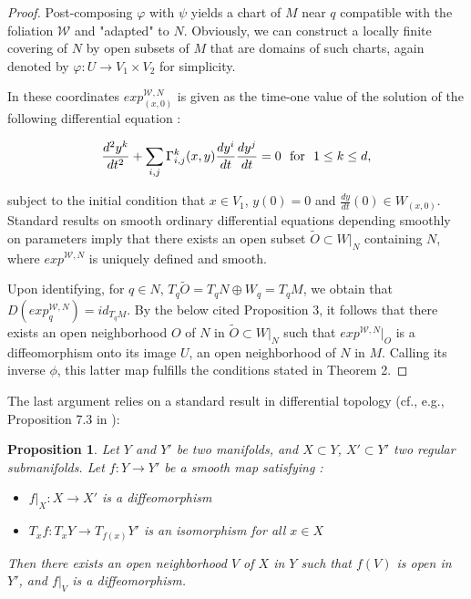 \documentclass[a4paper,12pt,leqno]{article}
\newtheorem{prop}{Proposition}
\begin{document}
\begin{proof}
Post-composing $\varphi$ with $\psi$ yields a chart of $M$ near $q$ compatible with the foliation $\mathcal{W}$ and "adapted" to $N$. 
Obviously, we can construct a locally finite covering of $N$ by open subsets of $M$ that are domains of such charts, again 
denoted by $\varphi:U\rightarrow V_1\times V_2$ for simplicity.

In these coordinates  $exp^{\mathcal{W},N}_{(x,0)}$ is given as the time-one value of the solution of the following differential equation : 



\begin{equation*}
\frac{d^2 y^k}{dt^2} + \sum_{i,j}\Gamma_{i,j}^k(x,y)\frac{d y^i}{dt} \frac{d y^j}{dt}=0   \,\,\,\,    \hbox{for}\, \,\, \,  1\leq k \leq d, 
\end{equation*}

\noindent subject to the initial condition that $x\in V_1$, $y(0)=0$ and $\frac{dy}{dt}(0)\in W_{(x,0)}$. Standard results on smooth ordinary 
differential equations depending smoothly on parameters imply that there exists an open subset $\widetilde{O}\subset W|_N$ 
containing $N$, where $exp^{\mathcal{W},N}$ is uniquely defined and smooth. 

Upon identifying, for $q\in N$, $T_q\widetilde{O}=T_qN\oplus W_q=T_qM$, we obtain that $D(exp^{\mathcal{W},N}_q)=id_{T_qM}$. 
By the below cited Proposition 3, it follows that there exists an open neighborhood $O$ of $N$ in $\widetilde{O}\subset W|_N$ 
such that $exp^{\mathcal{W},N}|_O$ is a diffeomorphism onto its image $U$, an open neighborhood of $N$ in $M$. Calling its inverse $\phi$, 
this latter map fulfills the conditions stated in Theorem 2.  



\end{proof}	

\noindent The last argument relies on a standard result in differential topology (cf., e.g., Proposition 7.3 in \cite{golubguil}):

\begin{prop}
Let $Y$ and $Y'$ be two manifolds, and $X\subset Y$, $X'\subset Y'$ two regular submanifolds. Let $f:Y\rightarrow Y'$ be a smooth map satisfying :
\begin{itemize}
\item $f|_X:X\rightarrow X'$ is a diffeomorphism
\item $T_xf:T_xY\rightarrow T_{f(x)}Y'$ is an isomorphism for all $x\in X$
\end{itemize}
Then there exists an open neighborhood $V$ of $X$ in $Y$ such that $f(V)$ is open in $Y'$, and $f|_V$ is a diffeomorphism.
\end{prop}
\end{document}
